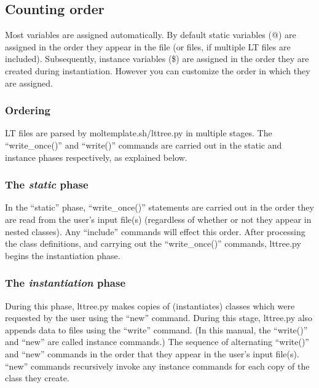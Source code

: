 \documentclass[11pt]{article}
\begin{document}
\subsection{Counting order}
\label{sec:order}
Most variables are assigned automatically. 
By default static variables (@) are assigned in the order 
they appear in the file (or files, if multiple LT files are included).
Subsequently, instance variables (\$)
are assigned in the order they are created during instantiation.
However you can customize the order in which they are assigned.

\subsubsection*{Ordering}

LT files are parsed by moltemplate.sh/lttree.py
in multiple stages.
The ``write\_once()'' and ``write()'' commands are carried out 
in the static and instance phases respectively, as explained below.

\subsubsection*{The \textit{static} phase}

In the ``static'' phase,
``write\_once()'' statements are carried out in the order they are read 
from the user's input file(s)
(regardless of whether or not they appear in nested classes).
Any ``include'' commands will effect this order. 
After processing the class definitions, and carrying out 
the ``write\_once()'' commands,
lttree.py begins the instantiation phase.

\subsubsection*{The \textit{instantiation} phase}

During this phase, lttree.py makes copies of (instantiates) classes 
which were requested by the user using the ``new'' command.
During this stage, lttree.py also appends data 
to files using the ``write'' command.
(In this manual, the ``write()'' and ``new'' are called instance commands.)
The sequence of alternating ``write()'' and ``new'' commands in the 
order that they appear in the user's input file(s).
``new'' commands recursively invoke any instance commands for each 
copy of the class they create.
\end{document}
